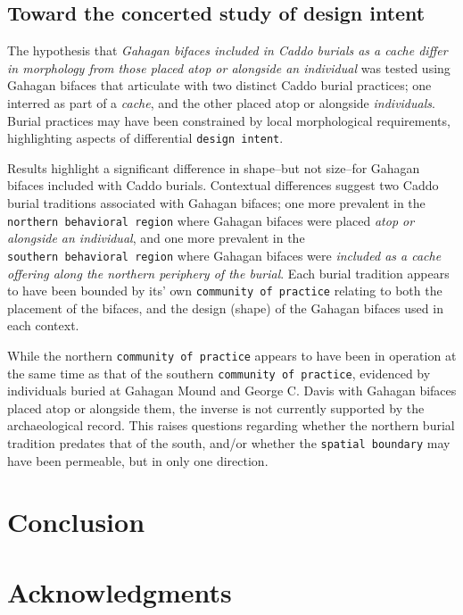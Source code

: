 \documentclass[]{interact}
\theoremstyle{plain}%
\theoremstyle{definition}
\theoremstyle{remark}
\begin{document}
\hypertarget{toward-the-concerted-study-of-design-intent}{%
\subsection{Toward the concerted study of design
intent}\label{toward-the-concerted-study-of-design-intent}}

The hypothesis that \emph{Gahagan bifaces included in Caddo burials as a
cache differ in morphology from those placed atop or alongside an
individual} was tested using Gahagan bifaces that articulate with two
distinct Caddo burial practices; one interred as part of a \emph{cache},
and the other placed atop or alongside \emph{individuals}. Burial
practices may have been constrained by local morphological requirements,
highlighting aspects of differential \texttt{design\ intent}.

Results highlight a significant difference in shape--but not size--for
Gahagan bifaces included with Caddo burials. Contextual differences
suggest two Caddo burial traditions associated with Gahagan bifaces; one
more prevalent in the \texttt{northern\ behavioral\ region} where
Gahagan bifaces were placed \emph{atop or alongside an individual}, and
one more prevalent in the \texttt{southern\ behavioral\ region} where
Gahagan bifaces were \emph{included as a cache offering along the
northern periphery of the burial}. Each burial tradition appears to have
been bounded by its' own \texttt{community\ of\ practice} relating to
both the placement of the bifaces, and the design (shape) of the Gahagan
bifaces used in each context.

While the northern \texttt{community\ of\ practice} appears to have been
in operation at the same time as that of the southern
\texttt{community\ of\ practice}, evidenced by individuals buried at
Gahagan Mound and George C. Davis with Gahagan bifaces placed atop or
alongside them, the inverse is not currently supported by the
archaeological record. This raises questions regarding whether the
northern burial tradition predates that of the south, and/or whether the
\texttt{spatial\ boundary} may have been permeable, but in only one
direction.

\hypertarget{conclusion}{%
\section{Conclusion}\label{conclusion}}

\hypertarget{acknowledgments}{%
\section*{Acknowledgments}\label{acknowledgments}}
\end{document}
